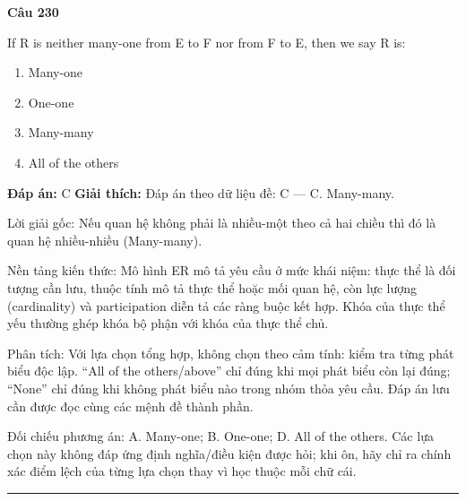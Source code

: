 \documentclass[11pt,a4paper]{article}
\newenvironment{question}[1]{%
  \par\vspace{1em}\noindent\textbf{\large Câu #1}\par\vspace{0.4em}
}{%
  \par\vspace{1em}\hrule\vspace{0.6em}
}
\newenvironment{choices}{%
  \begin{enumerate}[label=\textbf{\Alph*.},leftmargin=2.2em,itemsep=2pt,topsep=3pt]
}{%
  \end{enumerate}
}
\newcommand{\choice}{\item}
\begin{document}
\begin{question}{230}
If R is neither many-one from E to F nor from F to E, then we say R is:
\begin{choices}
\choice Many-one
\choice One-one
\choice Many-many
\choice All of the others
\end{choices}
\textbf{Đáp án:} C
\textbf{Giải thích:} Đáp án theo dữ liệu đề: C — C. Many-many.

Lời giải gốc: Nếu quan hệ không phải là nhiều-một theo cả hai chiều thì đó là quan hệ nhiều-nhiều (Many-many).

Nền tảng kiến thức: Mô hình ER mô tả yêu cầu ở mức khái niệm: thực thể là đối tượng cần lưu, thuộc tính mô tả thực thể hoặc mối quan hệ, còn lực lượng (cardinality) và participation diễn tả các ràng buộc kết hợp. Khóa của thực thể yếu thường ghép khóa bộ phận với khóa của thực thể chủ.

Phân tích: Với lựa chọn tổng hợp, không chọn theo cảm tính: kiểm tra từng phát biểu độc lập. “All of the others/above” chỉ đúng khi mọi phát biểu còn lại đúng; “None” chỉ đúng khi không phát biểu nào trong nhóm thỏa yêu cầu. Đáp án lưu cần được đọc cùng các mệnh đề thành phần.

Đối chiếu phương án: A. Many-one; B. One-one; D. All of the others. Các lựa chọn này không đáp ứng định nghĩa/điều kiện được hỏi; khi ôn, hãy chỉ ra chính xác điểm lệch của từng lựa chọn thay vì học thuộc mỗi chữ cái.
\end{question}
\end{document}

